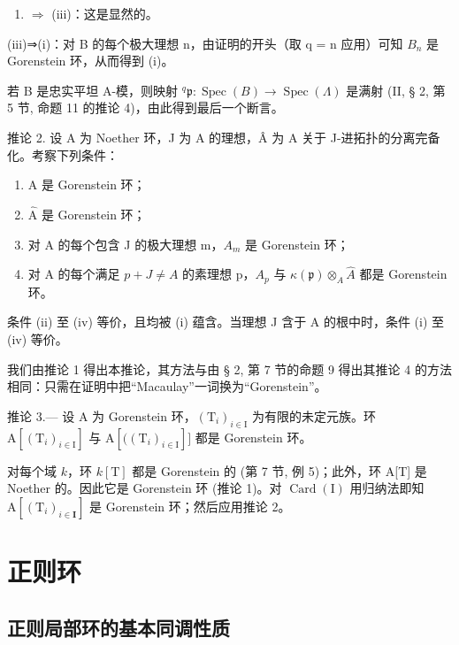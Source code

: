 \begin{enumerate}
\def\labelenumi{(\roman{enumi})}
\setcounter{enumi}{1}
\tightlist
\item
  \(\Rightarrow\) (iii)：这是显然的。
\end{enumerate}

(iii)⇒(i)：对 B 的每个极大理想 n，由证明的开头（取 q = n 应用）可知 \(B_{n}\) 是 Gorenstein 环，从而得到 (i)。

若 B 是忠实平坦 A-模，则映射 \(^{q}\mathfrak{p}:\operatorname{Spec}(B)\longrightarrow\operatorname{Spec}(\Lambda)\) 是满射 (II, § 2, 第 5 节, 命题 11 的推论 4)，由此得到最后一个断言。

推论 2. 设 A 为 Noether 环，J 为 A 的理想，Â 为 A 关于 J-进拓扑的分离完备化。考察下列条件：

\begin{enumerate}
\def\labelenumi{(\roman{enumi})}
\item
  A 是 Gorenstein 环；
\item
  \(\widehat{\mathrm{A}}\) 是 Gorenstein 环；
\item
  对 A 的每个包含 J 的极大理想 m，\(A_{m}\) 是 Gorenstein 环；
\item
  对 A 的每个满足 \(p + J \neq A\) 的素理想 p，\(A_{p}\) 与 \(\kappa(\mathfrak{p}) \otimes_{A} \widehat{A}\) 都是 Gorenstein 环。
\end{enumerate}

条件 (ii) 至 (iv) 等价，且均被 (i) 蕴含。当理想 J 含于 A 的根中时，条件 (i) 至 (iv) 等价。

我们由推论 1 得出本推论，其方法与由 § 2, 第 7 节的命题 9 得出其推论 4 的方法相同：只需在证明中把“Macaulay”一词换为“Gorenstein”。

推论 3.--- 设 A 为 Gorenstein 环，\((\mathrm{T}_{i})_{i\in\mathrm{I}}\) 为有限的未定元族。环 \(\mathrm{A}[(\mathrm{T}_{i})_{i\in\mathrm{I}}]\) 与 \(\mathrm{A}[((\mathrm{T}_{i})_{i\in\mathrm{I}}]]\) 都是 Gorenstein 环。

对每个域 \(k\)，环 \(k[\mathrm{T}]\) 都是 Gorenstein 的 (第 7 节, 例 5)；此外，环 A{[}T{]} 是 Noether 的。因此它是 Gorenstein 环 (推论 1)。对 \(\operatorname{Card}(\mathrm{I})\) 用归纳法即知 \(\mathrm{A}[(\mathrm{T}_i)_{i\in \mathbf{I}}]\) 是 Gorenstein 环；然后应用推论 2。

\section{正则环}

\subsection{正则局部环的基本同调性质}


